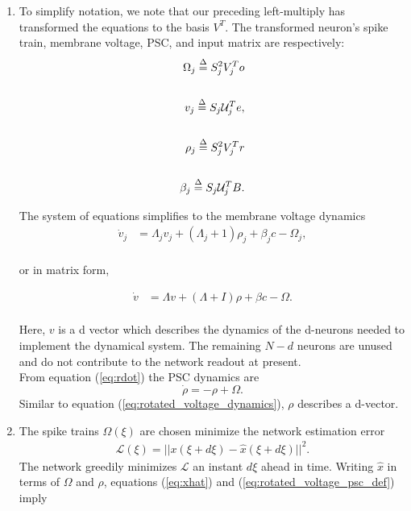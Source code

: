 \begin{enumerate}
\item To simplify notation, we note that our preceding left-multiply has transformed the equations to the basis $V^T$. The transformed neuron's spike train, membrane voltage, PSC, and input matrix are respectively: 
\begin{align}
    \label{eq:rotated_voltage_psc_def}
    \Omega_j \overset{\Delta}{=} S_j^2 V_j^T o \notag \\  \notag 
    \\  \notag 
    v_j \overset{\Delta}{=} S_j \mathcal{U}_j^T e, \notag  \\
    \\
    \rho_j \overset{\Delta}{=} S_j^2 V_j^T r  \notag \\  \notag 
    \\  \notag 
    \beta_j \overset{\Delta}{=} S_j \mathcal{U}_j^T B. \notag 
\end{align}

The system of equations simplifies to the membrane voltage dynamics
\begin{align*}
    \dot{v}_j &= 
    \Lambda_j v_j
    +
    (\Lambda_j + 1) \rho_j 
    +
     \beta_j c
    -
   \Omega_j,\\
\end{align*}

or in matrix form,

\begin{align}
\label{eq:rotated_voltage_dynamics}
    \dot{v} &= 
    \Lambda v
    +
    (\Lambda + I) \rho 
    +
     \beta c
    -
   \Omega.
   \end{align}
   \\
Here, $v$ is a d vector which describes the dynamics of the d-neurons needed to implement the dynamical system. The remaining $N-d$ neurons are unused and do not contribute to the network readout at present.   \\
From equation (\ref{eq:rdot}) the PSC dynamics are
\begin{equation}
\label{eq:rho_dot}
    \dot{\rho} = -\rho + \Omega.
\end{equation}
Similar to equation (\ref{eq:rotated_voltage_dynamics}), $\rho$ describes a d-vector. 

 
   
   
\item The spike trains $\Omega(\xi)$ are chosen minimize the network estimation error
\begin{align}
    \mathcal{L}(\xi) =  || x(\xi + d\xi) - \hat{x}(\xi + d\xi) ||^2. 
\end{align}
The network greedily minimizes $\mathcal{L}$ an instant $d\xi$ ahead in time. Writing $\hat{x}$ in terms of $\Omega$ and $\rho$, equations (\ref{eq:xhat}) and (\ref{eq:rotated_voltage_psc_def}) imply 


\end{enumerate}
